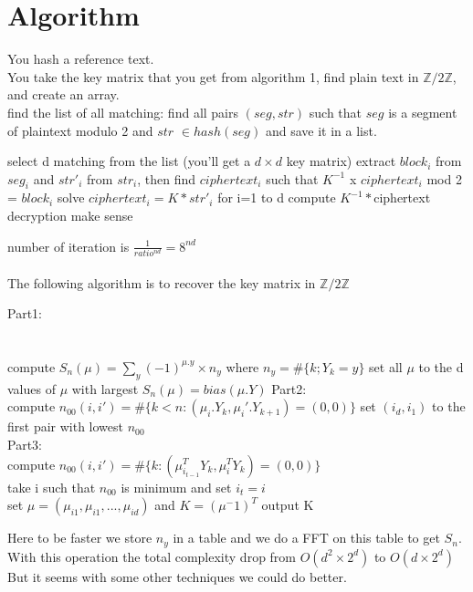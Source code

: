 \documentclass{article}
\begin{document}
\section*{Algorithm}
You hash a reference text.\\
You take the key matrix that you get from algorithm 1, find plain text in $\mathbb{Z}/2\mathbb{Z}$, and create an array.\\
find the list of all matching: find all pairs $(seg,str)$ such that $seg$ is a segment of plaintext modulo 2 and $str$ $\in hash(seg)$ and save it in a list.\\
\begin{algorithmic}[1]
	\REPEAT
\STATE select d matching from the list (you'll get a $d\times d$ key matrix)
	\STATE extract $block_{i}$ from $seg_{i}$ and $str'_{i}$ from $str_{i}$,
	\STATE then find $ciphertext_{i}$ such that $K^{-1}$ x $ciphertext_{i}$ mod 2 = $block_{i}$
\ENDFOR
\STATE solve $ciphertext_{i} = K * str'_{i}$ for i=1 to d
\STATE compute $K^{-1} * $ciphertext
\UNTIL decryption make sense
\end{algorithmic}
number of iteration is $ \frac{1}{ratio^{nd}} = 8^{nd}$
\\
\\
The following algorithm is to recover the key matrix in $\mathbb{Z}/2\mathbb{Z}$\\
\begin{algorithmic}[1]
\STATE Part1:\\
\\
\\
\FORALL{$\mu$}
	\STATE compute $S_n(\mu) = \sum_{y}{(-1)^{\mu.y} \times n_y}$ where $n_y=\#\{k;Y_k=y\}$
\ENDFOR
\STATE set all $\mu$ to the d values of $\mu$ with largest $S_n(\mu)=bias(\mu.Y)$
\STATE Part2:\\
	\STATE compute $n_{00}(i,i')=\#\{k<n:(\mu_i.Y_k,\mu_i'.Y_{k+1})=(0,0)\}$
\ENDFOR
\STATE set $(i_d,i_1)$ to the first pair with lowest $n_{00}$
\\
\STATE Part3:\\
		\STATE compute $n_{00}(i,i{'})=\#\{k:(\mu^{T}_{i_{t-1}}Y_{k},\mu^{T}_{i}Y_{k})=(0,0)\}$\\
	\ENDFOR
	\STATE take i such that $n_{00}$ is minimum and set $i_t=i$\\
\ENDFOR
\STATE set $\mu = (\mu_{i1},\mu_{i1},...,\mu_{id})$ and $K=(\mu^-1)^T$
\STATE output K
\end{algorithmic}
Here to be faster we store $n_y$ in a table and we do a FFT on this table to get $S_n$. With this operation the total complexity drop from $O(d^2 \times 2^d)$ to $O(d \times 2^d)$
But it seems with some other techniques we could do better.\\
\end{document}
